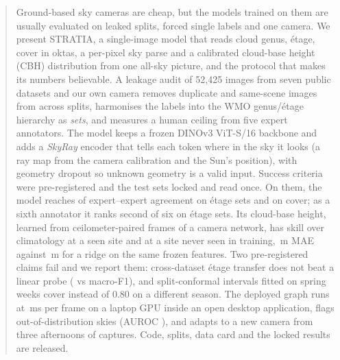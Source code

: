\begin{abstract}
Ground-based sky cameras are cheap, but the models trained on them are usually evaluated on leaked splits, forced
single labels and one camera. We present STRATIA, a single-image model that reads cloud genus, \'etage, cover in
oktas, a per-pixel sky parse and a calibrated cloud-base height (CBH) distribution from one all-sky picture, and
the protocol that makes its numbers believable. A leakage audit of 52,425 images from seven public datasets and our
own camera removes duplicate and same-scene images from across splits, harmonises the labels into the WMO
genus/\'etage hierarchy as \emph{sets}, and measures a human ceiling from five expert annotators. The model keeps a
frozen DINOv3 ViT-S/16 backbone and adds a \emph{SkyRay} encoder that tells each token where in the sky it looks
(a ray map from the camera calibration and the Sun's position), with geometry dropout so unknown geometry is a valid
input. Success criteria were pre-registered and the test sets locked and read once. On them, the model reaches
\nCtwoEtage{} of expert--expert agreement on \'etage sets and \nCtwoOktas{} on cover; as a sixth annotator it ranks
second of six on \'etage sets. Its cloud-base height, learned from ceilometer-paired frames of a camera network,
has skill \nSkillOldlr{} over climatology at a seen site and \nSkillWeste{} at a site never seen in training,
\nMaeModel{}\,m MAE against \nMaeRidge{}\,m for a ridge on the same frozen features. Two pre-registered claims
fail and we report them: cross-dataset \'etage transfer does not beat a linear probe (\nLodoModel{} vs
\nLodoProbe{} macro-F1), and split-conformal intervals fitted on spring weeks cover \nCovEighty{} instead of 0.80 on a
different season. The deployed graph runs at \nLatencyDml{}\,ms per frame on a laptop GPU inside an open desktop
application, flags out-of-distribution skies (AUROC \nOodAuroc{}), and adapts to a new camera from three afternoons
of captures. Code, splits, data card and the locked results are released.
\end{abstract}
